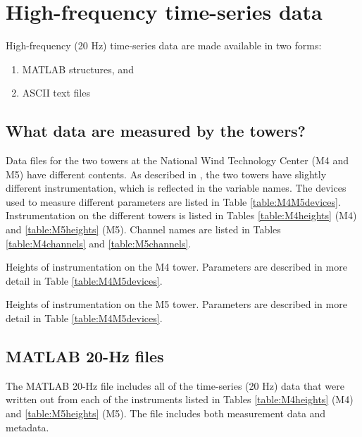 \chapter{High-frequency time-series data}
High-frequency (20 Hz) time-series data are made available in two forms:
\begin{enumerate}
\item MATLAB structures, and
\item ASCII text files
\end{enumerate}

\section{What data are measured by the towers?}
Data files for the two towers at the National Wind Technology Center (M4 and M5) have different contents. As described in \cite{Clifton_2013_c}, the two towers have slightly different instrumentation, which is reflected in the variable names. The devices used to measure different parameters are listed in Table \ref{table:M4M5devices}. Instrumentation on the different towers is listed in Tables \ref{table:M4heights} (M4) and \ref{table:M5heights} (M5). Channel names are listed in Tables \ref{table:M4channels} and \ref{table:M5channels}.



\begin{table}
\caption[M4 instrumentation]{Heights of instrumentation on the M4 tower. Parameters are described in more detail in Table \ref{table:M4M5devices}.\label{table:M4heights}}

\end{table}

\begin{table}
\caption[M5 instrumentation]{Heights of instrumentation on the M5 tower. Parameters are described in more detail in Table \ref{table:M4M5devices}.\label{table:M5heights}}

\end{table}

\clearpage






\section{MATLAB 20-Hz files\label{s:HFMatlab}}
The MATLAB 20-Hz file includes all of the time-series (20 Hz) data that were written out from each of the instruments listed in Tables \ref{table:M4heights} (M4) and \ref{table:M5heights} (M5). The file  includes both measurement data and metadata.

